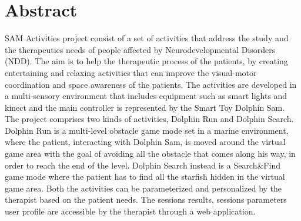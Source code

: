 \chapter{Abstract}
SAM Activities project consist of a set of activities that address the study and the therapeutics needs of people affected by Neurodevelopmental Disorders (NDD).
The aim is to help the therapeutic process of the patients, by creating entertaining and relaxing activities that can improve the visual-motor coordination and space awareness of the patients. 
The activities are developed in a multi-sensory environment that includes equipment such as smart lights and kinect and the main controller is represented by the Smart Toy Dolphin Sam. \newline
The project comprises two kinds of activities, Dolphin Run and Dolphin Search. Dolphin Run is a multi-level obstacle game mode set in a marine environment, where the patient, interacting with Dolphin Sam, is moved around the virtual game area with the goal of avoiding all the obstacle that comes along his way, in order to reach the end of the level. Dolphin Search instead is a Search\&Find game mode where the patient has to find all the starfish hidden in the virtual game area.
Both the activities can be parameterized and personalized by the therapist based on the patient needs. The sessions results, sessions parameters user profile are accessible by the therapist through a web application.
